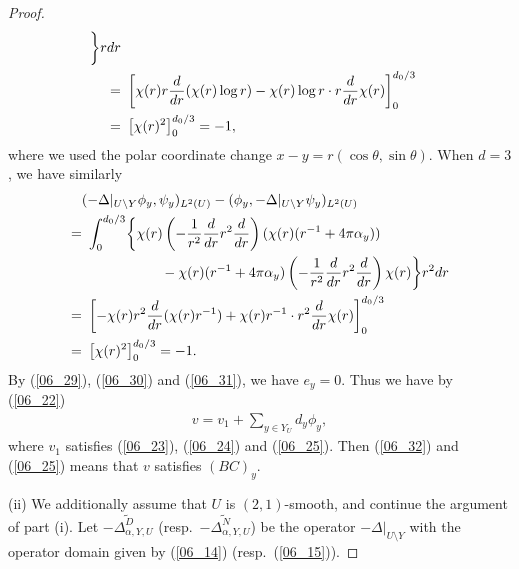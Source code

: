 \documentclass[12pt,a4paper]{article}
\begin{document}
\begin{proof}
\begin{align}
\biggr\}rdr
\notag\\
=&\ 
\left[
\chi(r)r\frac{d}{dr}(\chi(r)\log r)-\chi(r)\log r \cdot r \frac{d}{dr}\chi(r)
\right]_0^{d_0/3}
\notag\\
=&\ 
\left[
\chi(r)^2
\right]_0^{d_0/3}=-1,
\label{06_30}
\end{align}
where we used the polar coordinate change $x-y=r(\cos\theta,\sin\theta)$.
When $d=3$, we have similarly
\begin{align}
& (-\Delta|_{U\setminus Y}\phi_y,\psi_y)_{L^2(U)}
-
 (\phi_y,-\Delta|_{U\setminus Y}\psi_y)_{L^2(U)}
\notag\\
=&\ 
\int_0^{d_0/3}
\biggl\{
\chi(r)\left(-\frac{1}{r^2}\frac{d}{dr}r^2 \frac{d}{dr}\right)
(\chi(r)(r^{-1}+4\pi\alpha_y))
\notag\\
&\hspace{2cm}
-
\chi(r)(r^{-1}+4\pi\alpha_y)\left(-\frac{1}{r^2}\frac{d}{dr}r^2 \frac{d}{dr}\right)\chi(r)
\biggr\}r^2dr
\notag\\
=&\ 
\left[
-\chi(r)r^2\frac{d}{dr}(\chi(r)r^{-1})+\chi(r)r^{-1} \cdot r^2 \frac{d}{dr}\chi(r)
\right]_0^{d_0/3}
\notag\\
=&\ 
\left[
\chi(r)^2
\right]_0^{d_0/3}=-1.
\label{06_31}
 \end{align}
By (\ref{06_29}), (\ref{06_30}) and (\ref{06_31}),
we have $e_y=0$.
Thus we have by 
(\ref{06_22})
\begin{align}
\label{06_32}
 v = v_1 + \sum_{y\in Y_U}d_y \phi_y,
\end{align}
where $v_1$ satisfies 
(\ref{06_23}), (\ref{06_24}) and (\ref{06_25}).
Then (\ref{06_32}) and 
(\ref{06_25}) means that $v$ satisfies $(BC)_y$.





(ii) 
We additionally assume that
$U$ is $(2,1)$-smooth,
and continue the argument of part (i).
Let $\widetilde{-\Delta^D_{\alpha,Y,U}}$
(resp.\ $\widetilde{-\Delta^N_{\alpha,Y,U}}$)
be the operator $-\Delta|_{U\setminus Y}$
with the operator domain 
given by (\ref{06_14}) (resp.\ (\ref{06_15})).



\end{proof}
\end{document}
